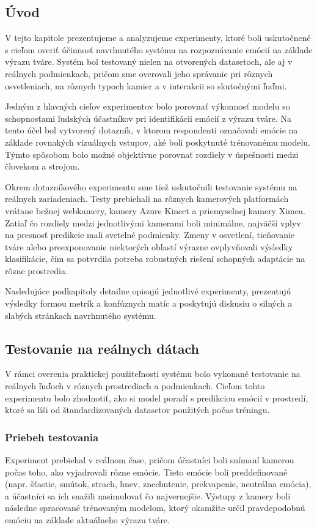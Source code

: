 \subsection{Úvod}
V tejto kapitole prezentujeme a analyzujeme experimenty, ktoré boli uskutočnené s cieľom overiť účinnosť navrhnutého systému na rozpoznávanie emócií na základe výrazu tváre. Systém bol testovaný nielen na otvorených datasetoch, ale aj v reálnych podmienkach, pričom sme overovali jeho správanie pri rôznych osvetleniach, na rôznych typoch kamier a v interakcii so skutočnými ľuďmi.

Jedným z hlavných cieľov experimentov bolo porovnať výkonnosť modelu so schopnosťami ľudských účastníkov pri identifikácii emócií z výrazu tváre. Na tento účel bol vytvorený dotazník, v ktorom respondenti označovali emócie na základe rovnakých vizuálnych vstupov, aké boli poskytnuté trénovanému modelu. Týmto spôsobom bolo možné objektívne porovnať rozdiely v úspešnosti medzi človekom a strojom.

Okrem dotazníkového experimentu sme tiež uskutočnili testovanie systému na reálnych zariadeniach. Testy prebiehali na rôznych kamerových platformách vrátane bežnej webkamery, kamery Azure Kinect a priemyselnej kamery Ximea. Zatiaľ čo rozdiely medzi jednotlivými kamerami boli minimálne, najväčší vplyv na presnosť predikcie mali svetelné podmienky. Zmeny v osvetlení, tieňovanie tváre alebo preexponovanie niektorých oblastí výrazne ovplyvňovali výsledky klasifikácie, čím sa potvrdila potreba robustných riešení schopných adaptácie na rôzne prostredia.

Nasledujúce podkapitoly detailne opisujú jednotlivé experimenty, prezentujú výsledky formou metrík a konfúznych matíc a poskytujú diskusiu o silných a slabých stránkach navrhnutého systému.
\subsection{Testovanie na re\'alnych d\'atach}

V r\'amci overenia praktickej pou\v{z}ite\v{l}nosti syst\'emu bolo vykonan\'e testovanie na re\'alnych \v{l}u\v{d}och v r\'oznych prostrediach a podmienkach. Cie\v{l}om tohto experimentu bolo zhodnoti\v{t}, ako si model porad\'i s predikciou em\'oci\'i v prostred\'i, ktor\'e sa l\'i\v{s}i od \v{s}tandardizovan\'ych datasetov pou\v{z}it\'ych po\v{c}as tr\'eningu.

\subsubsection{Priebeh testovania}
Experiment prebiehal v re\'alnom \v{c}ase, pri\v{c}om \'u\v{c}astn\'ici boli sn\'iman\'i kamerou po\v{c}as toho, ako vyjadrovali r\'ozne em\'ocie. Tieto em\'ocie boli preddefinovan\'e (napr. \v{s}\v{t}astie, sm\'utok, strach, hnev, znechutenie, prekvapenie, neutr\'alna em\'ocia), a \'u\v{c}astn\'ici sa ich sna\v{z}ili nasimulova\v{t} \v{c}o najvernej\v{s}ie. V\'ystupy z kamery boli n\'asledne spracovan\'e tr\'enovan\'ym modelom, ktor\'y okam\v{z}ite ur\v{c}il pravdepodobn\'u em\'ociu na z\'aklade aktu\'alneho v\'yrazu tv\'are.

